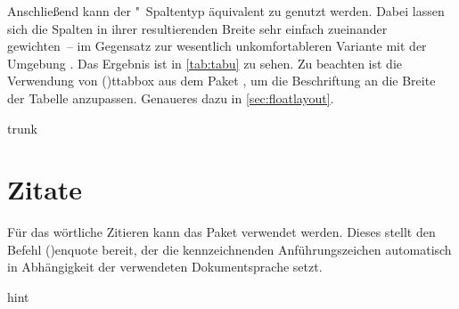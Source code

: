 \documentclass[%
  english,ngerman,%
  cdgeometry=no,DIV=12,%
  cd=false,cdfont=false,cdtitle=true,%
  headings=normal,%
  automark,%
  listof=toc,%
]{tudscrartcl}
\begin{document}
Anschließend kann der "~Spaltentyp äquivalent zu  genutzt 
werden. Dabei lassen sich die Spalten in ihrer resultierenden Breite sehr 
einfach zueinander gewichten~-- im Gegensatz zur wesentlich unkomfortableren 
Variante mit der Umgebung . Das Ergebnis ist in 
\autoref{tab:tabu} zu sehen. Zu beachten ist die Verwendung von 
\Macro(){ttabbox} aus dem Paket , um die 
Beschriftung an die Breite der Tabelle anzupassen. 
Genaueres dazu in \autoref{sec:floatlayout}.
%
\begin{Code}[input]{trunk}
\begin{table}
\end{table}

\end{Code}



\section{Zitate}

Für das wörtliche Zitieren kann das Paket  verwendet werden. 
Dieses stellt den Befehl \Macro(){enquote} bereit, der die 
kennzeichnenden Anführungszeichen automatisch in Abhängigkeit der verwendeten 
Dokumentsprache setzt. 
%
\begin{Code}{hint}
\usepackage{csquotes}
\end{Code}
\end{document}
